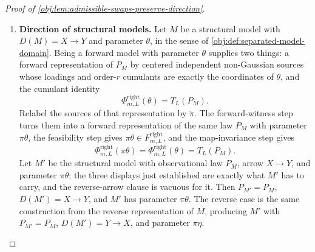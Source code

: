 \begin{proof}[Proof of \cref{obj:lem:admissible-swaps-preserve-direction}]
\begin{enumerate}
\item \textbf{Direction of structural models.}  Let \(M\) be a structural model with \(D(M)=X\to Y\) and parameter \(\theta\), in the sense of \cref{obj:def:separated-model-domain}.  Being a forward model with parameter \(\theta\) supplies two things: a forward representation of \(P_M\) by centered independent non-Gaussian sources whose loadings and order-\(r\) cumulants are exactly the coordinates of \(\theta\), and the cumulant identity
\[
\Phi^{\mathrm{right}}_{m,L}(\theta)=T_L(P_M).
\]
Relabel the sources of that representation by \(\tilde\pi\).  The forward-witness step turns them into a forward representation of the same law \(P_M\) with parameter \(\pi\theta\), the feasibility step gives \(\pi\theta\in F^{\mathrm{right}}_{m,L}\), and the map-invariance step gives
\[
\Phi^{\mathrm{right}}_{m,L}(\pi\theta)=\Phi^{\mathrm{right}}_{m,L}(\theta)=T_L(P_M).
\]
Let \(M'\) be the structural model with observational law \(P_M\), arrow \(X\to Y\), and parameter \(\pi\theta\); the three displays just established are exactly what \(M'\) has to carry, and the reverse-arrow clause is vacuous for it.  Then \(P_{M'}=P_M\), \(D(M')=X\to Y\), and \(M'\) has parameter \(\pi\theta\).  The reverse case is the same construction from the reverse representation of \(M\), producing \(M'\) with \(P_{M'}=P_M\), \(D(M')=Y\to X\), and parameter \(\pi\eta\).


\end{enumerate}
\end{proof}
